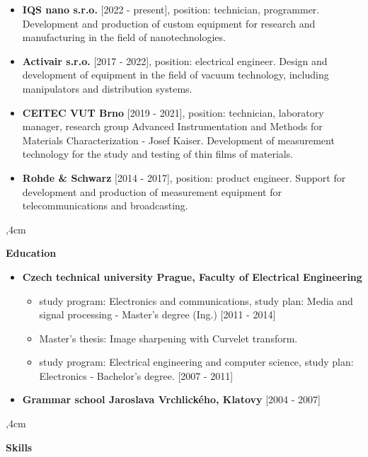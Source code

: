 \documentclass[10pt]{article}
\begin{document}
\begin{itemize}
\item \textbf{IQS nano s.r.o.} [2022 - present], position: technician, programmer. Development and production of custom equipment for research and manufacturing in the field of nanotechnologies.
\item \textbf{Activair s.r.o.} [2017 - 2022], position: electrical engineer. Design and development of equipment in the field of vacuum technology, including manipulators and distribution systems.
\item \textbf{CEITEC VUT Brno} [2019 - 2021], position: technician, laboratory manager, research group Advanced Instrumentation and Methods for Materials Characterization - Josef Kaiser. 
Development of measurement technology for the study and testing of thin films of materials.
\item \textbf{Rohde \& Schwarz} [2014 - 2017], position: product engineer. Support for development and production of measurement equipment for telecommunications and broadcasting.
\end{itemize}

\noindent\hrulefill
{},4cm

\textbf{Education}

\begin{itemize}
    \item [\faGraduationCap]\textbf{Czech technical university Prague, Faculty of Electrical Engineering}
    \begin{itemize}
        \item study program: Electronics and communications, study plan: Media and signal processing - Master's degree (Ing.) [2011 - 2014]
        \item Master's thesis: Image sharpening with Curvelet transform.
        \item study program: Electrical engineering and computer science, study plan: Electronics - Bachelor's degree. [2007 - 2011]
    \end{itemize}
    \item[\faGraduationCap] \textbf{Grammar school Jaroslava Vrchlického, Klatovy} [2004 - 2007]
\end{itemize}

\noindent\hrulefill
{},4cm

\textbf{Skills}
\end{document}
